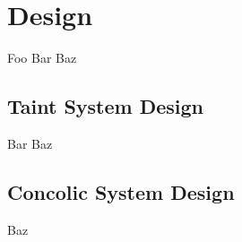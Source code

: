 \chapter{Design}

Foo Bar Baz

\section{Taint System Design}

Bar Baz

\section{Concolic System Design}

Baz
